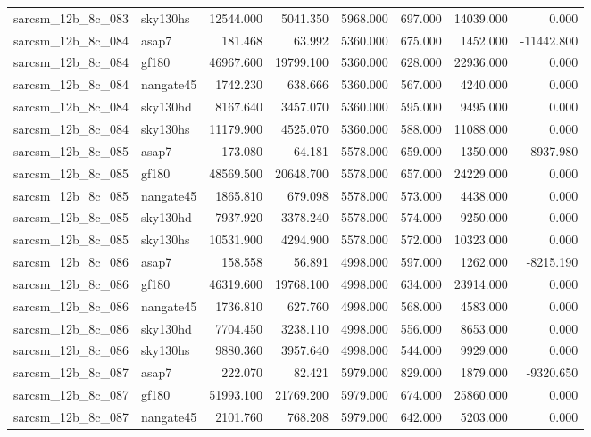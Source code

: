 \begin{tabular}{llrrrrrr}
sarcsm\_12b\_8c\_083 & sky130hs & 12544.000 & 5041.350 & 5968.000 & 697.000 & 14039.000 & 0.000 \\
sarcsm\_12b\_8c\_084 & asap7 & 181.468 & 63.992 & 5360.000 & 675.000 & 1452.000 & -11442.800 \\
sarcsm\_12b\_8c\_084 & gf180 & 46967.600 & 19799.100 & 5360.000 & 628.000 & 22936.000 & 0.000 \\
sarcsm\_12b\_8c\_084 & nangate45 & 1742.230 & 638.666 & 5360.000 & 567.000 & 4240.000 & 0.000 \\
sarcsm\_12b\_8c\_084 & sky130hd & 8167.640 & 3457.070 & 5360.000 & 595.000 & 9495.000 & 0.000 \\
sarcsm\_12b\_8c\_084 & sky130hs & 11179.900 & 4525.070 & 5360.000 & 588.000 & 11088.000 & 0.000 \\
sarcsm\_12b\_8c\_085 & asap7 & 173.080 & 64.181 & 5578.000 & 659.000 & 1350.000 & -8937.980 \\
sarcsm\_12b\_8c\_085 & gf180 & 48569.500 & 20648.700 & 5578.000 & 657.000 & 24229.000 & 0.000 \\
sarcsm\_12b\_8c\_085 & nangate45 & 1865.810 & 679.098 & 5578.000 & 573.000 & 4438.000 & 0.000 \\
sarcsm\_12b\_8c\_085 & sky130hd & 7937.920 & 3378.240 & 5578.000 & 574.000 & 9250.000 & 0.000 \\
sarcsm\_12b\_8c\_085 & sky130hs & 10531.900 & 4294.900 & 5578.000 & 572.000 & 10323.000 & 0.000 \\
sarcsm\_12b\_8c\_086 & asap7 & 158.558 & 56.891 & 4998.000 & 597.000 & 1262.000 & -8215.190 \\
sarcsm\_12b\_8c\_086 & gf180 & 46319.600 & 19768.100 & 4998.000 & 634.000 & 23914.000 & 0.000 \\
sarcsm\_12b\_8c\_086 & nangate45 & 1736.810 & 627.760 & 4998.000 & 568.000 & 4583.000 & 0.000 \\
sarcsm\_12b\_8c\_086 & sky130hd & 7704.450 & 3238.110 & 4998.000 & 556.000 & 8653.000 & 0.000 \\
sarcsm\_12b\_8c\_086 & sky130hs & 9880.360 & 3957.640 & 4998.000 & 544.000 & 9929.000 & 0.000 \\
sarcsm\_12b\_8c\_087 & asap7 & 222.070 & 82.421 & 5979.000 & 829.000 & 1879.000 & -9320.650 \\
sarcsm\_12b\_8c\_087 & gf180 & 51993.100 & 21769.200 & 5979.000 & 674.000 & 25860.000 & 0.000 \\
sarcsm\_12b\_8c\_087 & nangate45 & 2101.760 & 768.208 & 5979.000 & 642.000 & 5203.000 & 0.000 \\

\end{tabular}

